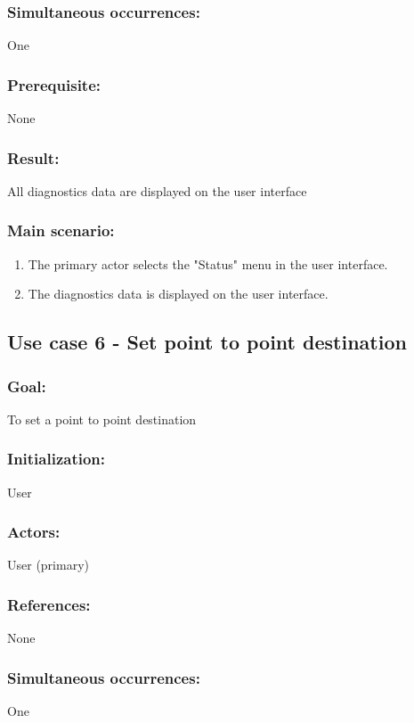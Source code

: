 \subsubsection*{Simultaneous occurrences:}
One

\subsubsection*{Prerequisite:}
None

\subsubsection*{Result:}
All diagnostics data are displayed on the user interface

\subsubsection*{Main scenario:}
\begin{enumerate}
	\item The primary actor selects the "Status" menu in the user interface.
	\item The diagnostics data is displayed on the user interface. 
\end{enumerate}


\subsection{Use case 6 - Set point to point destination}
\subsubsection*{Goal:}
To set a point to point destination

\subsubsection*{Initialization:}
User

\subsubsection*{Actors:}
User (primary)

\subsubsection*{References:}
None

\subsubsection*{Simultaneous occurrences:}
One

